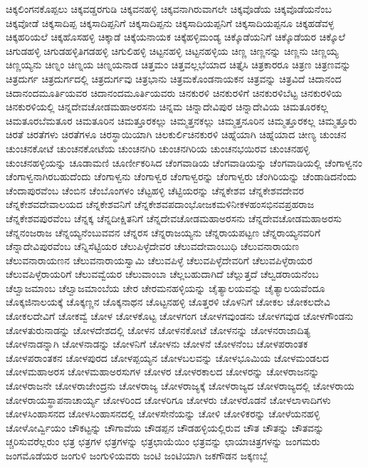 {ಚಿಕ್ಕಲಿಂಗನಕೊಪ್ಪಲು
ಚಿಕ್ಕವಡ್ಡರಗುಡಿ
ಚಿಕ್ಕವನಹಳ್ಳಿ
ಚಿಕ್ಕವನಾಗಿರುವಾಗಲೇ
ಚಿಕ್ಕವೊಡೆಯ
ಚಿಕ್ಕವೊಡೆಯನೆಂಬ
ಚಿಕ್ಕವೋಡೆ
ಚಿಕ್ಕಸಾದಿಪ್ಪ
ಚಿಕ್ಕಸಾದಿಪ್ಪನಿಗೆ
ಚಿಕ್ಕಸಾದಿಪ್ಪನು
ಚಿಕ್ಕಸಾದಿಯಪ್ಪನಿಗೆ
ಚಿಕ್ಕಸಾದಿಯಪ್ಪನೂ
ಚಿಕ್ಕಹಡೆವಳ್ಳ
ಚಿಕ್ಕಹರಿಯಲೆ
ಚಿಕ್ಕಹೊಸಹಳ್ಳಿ
ಚಿಕ್ಕಾಡೆ
ಚಿಕ್ಕೆಯನಾಯಕ
ಚಿಕ್ಕೆಹಳ್ಳಿಮಂಡ್ಯ
ಚಿಕ್ಕೊಡೆಯನಿಗೆ
ಚಿಕ್ಕೊಡೆಯರ
ಚಿಕ್ಕೊಲೆ
ಚಿಗುಡಹಳ್ಳಿ
ಚಿಗುಡಹಳ್ಳಿತಿಗಡಹಳ್ಳಿ
ಚಿಗುಲಿಹಳ್ಳಿ
ಚಿಟ್ಟನಹಳ್ಳಿ
ಚಿಟ್ಟನಹಳ್ಳಿಯ
ಚಿಣ್ಣ
ಚಿಣ್ಣನನ್ನು
ಚಿಣ್ಣನು
ಚಿಣ್ಣಯ್ಯ
ಚಿಣ್ಣಯ್ಯನು
ಚಿಣ್ನಂ
ಚಿಣ್ನಯ
ಚಿಣ್ನಯನಾಡ
ಚಿತ್ತಮಂ
ಚಿತ್ತವಲ್ಲಭೆಯಾದ
ಚಿತ್ತೈಸಿ
ಚಿತ್ರಕಾರರೂ
ಚಿತ್ರಣ
ಚಿತ್ರಣವನ್ನು
ಚಿತ್ರದುರ್ಗ
ಚಿತ್ರದುರ್ಗದಲ್ಲಿ
ಚಿತ್ರದುರ್ಗವು
ಚಿತ್ರಭಾನು
ಚಿತ್ರಮಕೊಂಡನಾಯಕನ
ಚಿತ್ರವನ್ನು
ಚಿತ್ರವಿದೆ
ಚಿದಾನಂದ
ಚಿದಾನಂದಮೂರ್ತಿಯವರ
ಚಿದಾನಂದಮೂರ್ತಿಯವರು
ಚಿನಕುರಳಿ
ಚಿನಕುರಳಿಗೆ
ಚಿನಕುರಳಿಬೆಟ್ಟ
ಚಿನಕುರಳಿಯ
ಚಿನಕುರಳಿಯಲ್ಲಿ
ಚಿನ್ನದೇವಚೋಡಮಹಾಅರಸನು
ಚಿನ್ನಮ
ಚಿನ್ನಾದೇವಿಪುರ
ಚಿನ್ನಾದೇವಿಯ
ಚಿಮತೂರಕಲ್ಲ
ಚಿಮತೂರಬೆಮತೂರ
ಚಿಮತೂರಿನ
ಚಿಮತ್ತೂರಕಲ್ಲು
ಚಿಮ್ಮತ್ತನಕಲ್ಲು
ಚಿಮ್ಮತ್ತನೂರಿನ
ಚಿಮ್ಮತ್ತೂರಕಲ್ಲ
ಚಿಮ್ಮತ್ತೂರು
ಚಿರತೆ
ಚಿರತೆಗಳು
ಚಿರತೆಗಳೂ
ಚಿರಸ್ಥಾಯಿಯಾಗಿ
ಚಿಲಕುರ್ಲಿಚಿನಕುರಳಿ
ಚಿಹ್ನೆಯಾಗಿ
ಚಿಹ್ನೆಯಾದ
ಚೀಣ್ಯ
ಚುಂಚನ
ಚುಂಚನಕೋಟೆ
ಚುಂಚನಕೋಟೆಯ
ಚುಂಚನಗಿರಿ
ಚುಂಚನಗಿರಿಯ
ಚುಂಚನಭಯಿರವ
ಚುಂಚನಹಳ್ಳಿ
ಚುಂಚನಹಳ್ಳಿಯನ್ನು
ಚೂಡಾಮಣಿ
ಚೂರ್ಣೀಕರಿಸಿದ
ಚೆಂಗವಾಡಿಯ
ಚೆಂಗವಾಡಿಯನ್ನು
ಚೆಂಗವಾಡಿಯಲ್ಲಿ
ಚೆಂಗಾಳ್ವನಂ
ಚೆಂಗಾಳ್ವನಾಗಿರಬಹುದೆಂದು
ಚೆಂಗಾಳ್ವನು
ಚೆಂಗಾಳ್ವರ
ಚೆಂಗಾಳ್ವರನ್ನು
ಚೆಂಗಾಳ್ವರು
ಚೆಂಗಿರಿಯನ್ನು
ಚೆಂಡಾಡಿದನೆಂದು
ಚೆಂದಾಪುರವೆಂಬ
ಚೆಂಬಿನ
ಚೆಂಬೊಂಗಳಂ
ಚೆಟ್ಟಹಳ್ಳಿ
ಚೆಟ್ಟಿಯರನ್ನು
ಚೆನ್ನಕೇಶವ
ಚೆನ್ನಕೇಶವದೇವರ
ಚೆನ್ನಕೇಶವದೇವಾಲಯದ
ಚೆನ್ನಕೇಶವನಿಗೆ
ಚೆನ್ನಕೇಶವಪದಾಂಭೋಜಕಮಳಿನೀಕಳಹಂಸಭಿನವಪ್ರಹರಾಜ
ಚೆನ್ನಕೇಶವಪುರವೆಂಬ
ಚೆನ್ನಕ್ಕ
ಚೆನ್ನದೀಕ್ಷಿತನಿಗೆ
ಚೆನ್ನದೇವಚೋಡಮಹಾಅರಸನು
ಚೆನ್ನದೇವಚೋಡಮಹಾಅರಸು
ಚೆನ್ನನಂಜರಾಜ
ಚೆನ್ನಯ್ಯನೆಂಬುವವನ
ಚೆನ್ನರಸ
ಚೆನ್ನರಾಜಯ್ಯನು
ಚೆನ್ನರಾಯಪಟ್ಟಣ
ಚೆನ್ನರಾಯ್ಯನವರಿಗೆ
ಚೆನ್ನಾದೇವಿಪುರವೆಂಬ
ಚೆನ್ನಿಸೆಟ್ಟಿಯರ
ಚೆಲುಪಿಳ್ಳೆದೇವರ
ಚೆಲುವದೇವಾಂಬುಧಿ
ಚೆಲುವನಾರಾಯಣ
ಚೆಲುವನಾರಾಯಣನ
ಚೆಲುವನಾರಾಯಸ್ವಾಮಿ
ಚೆಲುವಪಿಳ್ಳೆ
ಚೆಲುವಪಿಳ್ಳೆದೇವರಿಗೆ
ಚೆಲುವಪಿಳ್ಳೆರಾಯರ
ಚೆಲುವಪಿಳ್ಳೆರಾಯರಿಗೆ
ಚೆಲುವವ್ವೆಯರ
ಚೆಲುವಾಂಬಾ
ಚೆಲ್ಲಬಹುದಾಗಿದೆ
ಚೆಲ್ಲುತ್ತದೆ
ಚೆಲ್ವಡರಾಯನೆಂಬ
ಚೆಲ್ವಾಜಮಾಂಬ
ಚೆಲ್ವಾಜಮಾಂಬೆಯ
ಚೇರ
ಚೇರಮನಹಳ್ಳಿಯನ್ನು
ಚೈತ್ಯಾಲಯವನ್ನು
ಚೈತ್ಯಾಲಯವೆಂದೂ
ಚೊಕ್ಕಜಿನಾಲಯಕ್ಕೆ
ಚೊಕ್ಕಣ್ಣನ
ಚೊಕ್ಕನಾಥನ
ಚೊಟ್ಟನಹಳ್ಳಿ
ಚೊತ್ತರಳಿ
ಚೊಳನಿಗೆ
ಚೋಕಲ
ಚೋಕಲದೇವಿ
ಚೋಕಲದೇವಿಗೆ
ಚೋಕವ್ವೆ
ಚೋಳ
ಚೋಳಕೊಟ್ಟ
ಚೋಳಗಂಗ
ಚೋಳಗವುಂಡನು
ಚೋಳಗವುಡ
ಚೋಳಗೌಂಡನು
ಚೋಳತುರುನಾಡನ್ನು
ಚೋಳದೇಶದಲ್ಲಿ
ಚೋಳನ
ಚೋಳನಕೋಟೆ
ಚೋಳನನ್ನು
ಚೋಳನರಾಜಾದಿತ್ಯ
ಚೋಳನಾಡನ್ನಾಗಿ
ಚೋಳನಾಡನ್ನು
ಚೋಳನಿಗೆ
ಚೋಳನು
ಚೋಳನೆ
ಚೋಳನೆಂಬ
ಚೋಳಪರಾಂತಕ
ಚೋಳಪರಾಂತಕನ
ಚೋಳಪುರದ
ಚೋಳಪ್ಪಯ್ಯನ
ಚೋಳಬಲವನ್ನು
ಚೋಳಭೂಮಿಯ
ಚೋಳಮಂಡಲದ
ಚೋಳಮಹಾಅರಸ
ಚೋಳಮಹಾಅರಸುಗಳ
ಚೋಳರ
ಚೋಳರಕಾಲದ
ಚೋಳರನ್ನು
ಚೋಳರಾಜನನ್ನು
ಚೋಳರಾಜನೇ
ಚೋಳರಾಜೇಂದ್ರನು
ಚೋಳರಾಜ್ಯ
ಚೋಳರಾಜ್ಯಕ್ಕೆ
ಚೋಳರಾಜ್ಯದ
ಚೋಳರಾಜ್ಯದಲ್ಲಿ
ಚೋಳರಾಯ
ಚೋಳರಾಯಸ್ಥಾಪನಾಚಾರ್ಯ್ಯ
ಚೋಳರಿಂದ
ಚೋಳರಿಗೂ
ಚೋಳರು
ಚೋಳರೊಡನೆ
ಚೋಳಲಾಳಾದಿಗಳು
ಚೋಳಸಿಂಹಾಸನದ
ಚೋಳಸಿಂಹಾಸನದಲ್ಲಿ
ಚೋಳಸೇನೆಯನ್ನು
ಚೋಳಿ
ಚೋಳಿಕರನ್ನು
ಚೋಳೆಯನಹಳ್ಳಿ
ಚೋಳೋರ್ವ್ವಿಯಂ
ಚೌಕಟ್ಟನ್ನು
ಚೌಗಾವೆಯ
ಚೌಡಪ್ಪನ
ಚೌಡಹಳ್ಳಿಯಲ್ಲಿರುವ
ಚೌತ
ಚೌತನ್ನು
ಚೌತವನ್ನು
ಚ್ಚರಿಸುವರೆಲ್ಲರುಂ
ಛತ್ರ
ಛತ್ರಗಳ
ಛತ್ರಗಳನ್ನು
ಛತ್ರಛಾಯೆಯಿಂ
ಛತ್ರವನ್ನು
ಛಾಯಾಚಿತ್ರಗಳನ್ನು
ಜಂಗಮರು
ಜಂಗಮೊಡೆಯರ
ಜಂಗುಳಿ
ಜಂಗುಳಿಯವರು
ಜಂಟಿ
ಜಂಟಿಯಾಗಿ
ಜಕಗೌಡನ
ಜಕ್ಕಣಬ್ಬೆ
}
